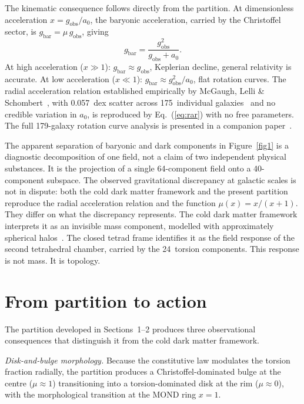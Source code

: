 \documentclass[twocolumn]{iopjournal}
\begin{document}
The kinematic consequence follows directly from the partition.
At dimensionless acceleration $x = g_{\mathrm{obs}}/a_0$, the
baryonic acceleration, carried by the Christoffel sector, is
$g_{\mathrm{bar}} = \mu\,g_{\mathrm{obs}}$, giving
\begin{equation}
  g_{\mathrm{bar}} =
  \frac{g_{\mathrm{obs}}^2}{g_{\mathrm{obs}} + a_0}.
  \label{eq:rar}
\end{equation}
At high acceleration ($x \gg 1$):
$g_{\mathrm{bar}} \approx g_{\mathrm{obs}}$, Keplerian
decline, general relativity is accurate.  At low acceleration
($x \ll 1$):
$g_{\mathrm{bar}} \approx g_{\mathrm{obs}}^2/a_0$, flat
rotation curves.  The radial acceleration relation established
empirically by McGaugh, Lelli \&
Schombert~\cite{McGaugh2016}, with 0.057~dex scatter across
175~individual galaxies~\cite{Li2018} and no credible
variation in $a_0$, is reproduced by Eq.~(\ref{eq:rar}) with
no free parameters.  The full 179-galaxy rotation curve
analysis is presented in a companion
paper~\cite{Nelson2026c}.

The apparent separation of baryonic and dark components in
Figure~\ref{fig1} is a diagnostic decomposition of one field,
not a claim of two independent physical substances.  It is the
projection of a single 64-component field onto a 40-component
subspace.  The observed gravitational discrepancy at galactic
scales is not in dispute: both the cold dark matter framework
and the present partition reproduce the radial acceleration
relation and the function $\mu(x) = x/(x{+}1)$.  They differ
on what the discrepancy represents.  The cold dark matter
framework interprets it as an invisible mass component,
modelled with approximately spherical
halos~\cite{NFW1996}.  The closed tetrad frame identifies it
as the field response of the second tetrahedral chamber,
carried by the 24~torsion components.  This response is not
mass.  It is topology.


\section{From partition to action}

The partition developed in Sections~1--2 produces three
observational consequences that distinguish it from the cold
dark matter framework.

\textit{Disk-and-bulge morphology.}  Because the constitutive
law modulates the torsion fraction radially, the partition
produces a Christoffel-dominated bulge at the centre
($\mu \approx 1$) transitioning into a torsion-dominated disk
at the rim ($\mu \approx 0$), with the morphological
transition at the MOND ring $x = 1$.
\end{document}
